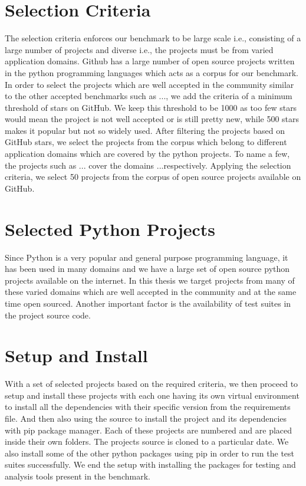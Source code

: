 \section{Selection Criteria}
\label{approach:selection criteria}
The selection criteria enforces our benchmark to be large scale i.e., consisting of a large number of projects and diverse i.e., the projects must be from varied application domains. Github \cite{github} has a large number of open source projects written in the python programming languages which acts as a corpus for our benchmark. In order to select the projects which are well accepted in the community similar to the other accepted benchmarks such as ..., we add the criteria of a minimum threshold of stars on GitHub. We keep this threshold to be 1000 as too few stars would mean the project is not well accepted or is still pretty new, while 500 stars makes it popular but not so widely used. After filtering the projects based on GitHub stars, we select the projects from the corpus which belong to different application domains which are covered by the python projects. To name a few, the projects such as ... cover the domains ...respectively. Applying the selection criteria, we select 50 projects from the corpus of open source projects available on GitHub.

\section{Selected Python Projects}
\label{approach:selection of projects}
Since Python is a very popular and general purpose programming language, it has been used in many domains and we have a large set of open source python projects available on the internet. In this thesis we target projects from many of these varied domains which are well accepted in the community and at the same time open sourced. Another important factor is the availability of test suites in the project source code. 

\section{Setup and Install}
\label{approach:setup and install}
With a set of selected projects based on the required criteria, we then proceed to setup and install these projects with each one having its own virtual environment to install all the dependencies with their specific version from the requirements file. And then also using the source to install the project and its dependencies with pip package manager. Each of these projects are numbered and are placed inside their own folders. The projects source is cloned to a particular date. We also install some of the other python packages using pip in order to run the test suites successfully. We end the setup with installing the packages for testing and analysis tools present in the benchmark.

